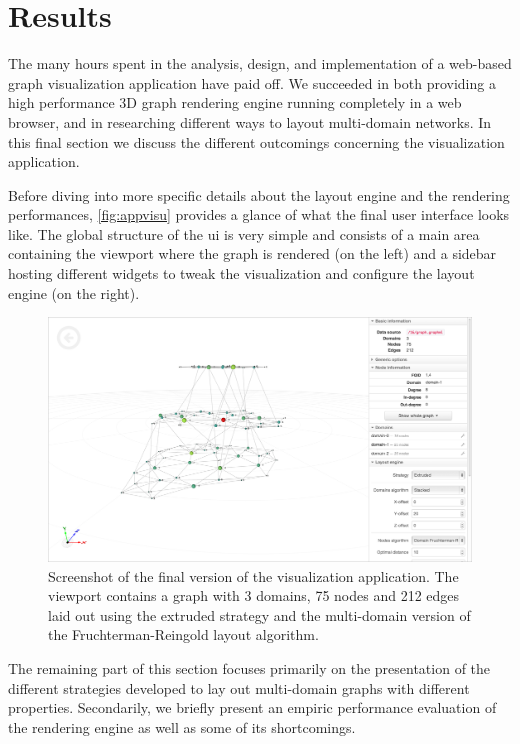 \section{Results}
\label{sec:visu/results}

The many hours spent in the analysis, design, and implementation of a web-based graph visualization application have paid off. We succeeded in both providing a high performance 3D graph rendering engine running completely in a web browser, and in researching different ways to layout multi-domain networks. In this final section we discuss the different outcomings concerning the visualization application.

Before diving into more specific details about the layout engine and the rendering performances, \vref{fig:appvisu} provides a glance of what the final user interface looks like. The global structure of the \gls{ui} is very simple and consists of a main area containing the viewport where the graph is rendered (on the left) and a sidebar hosting different widgets to tweak the visualization and configure the layout engine (on the right).

\begin{figure}
  \centering
  \includegraphics[width=\linewidth]{images/visuapp}
  \caption[Screenshot of the visualization application.]{Screenshot of the final version of the visualization application. The viewport contains a graph with 3 domains, 75 nodes and 212 edges laid out using the extruded strategy and the multi-domain version of the Fruchterman-Reingold layout algorithm.}
  \label{fig:appvisu}
\end{figure}

The remaining part of this section focuses primarily on the presentation of the different strategies developed to lay out multi-domain graphs with different properties. Secondarily, we briefly present an empiric performance evaluation of the rendering engine as well as some of its shortcomings.

